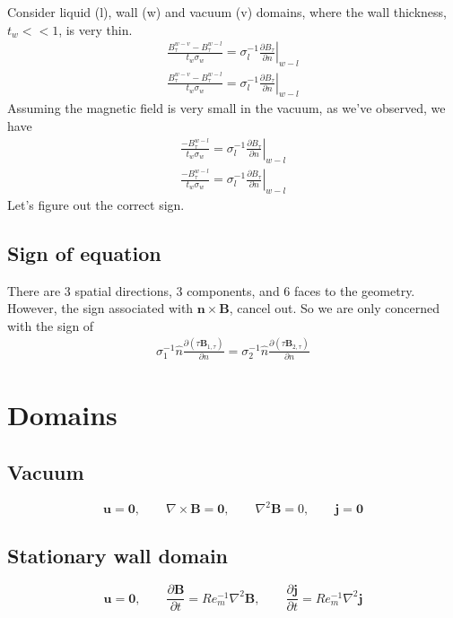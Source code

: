 \documentclass[11pt]{article}
\newcommand{\B}{\mathbf{B}}
\newcommand{\U}{\mathbf{u}}
\newcommand{\curl}{\nabla \times}
\newcommand{\PD}{\partial}
\newcommand{\J}{\mathbf{j}}
\newcommand{\N}{\mathbf{n}}
\begin{document}
Consider liquid (l), wall (w) and vacuum (v) domains, where the wall thickness, $t_w<<1$, is very thin.
\begin{equation} \begin{aligned}
  \frac{B_{\tau}^{w-v}-B_{\tau}^{w-l}}{t_w \sigma_w}=\left. \sigma_l^{-1}\frac{\PD B_{\tau}}{\PD n} \right|_{w-l} \\
  \frac{B_{\tau}^{w-v}-B_{\tau}^{w-l}}{t_w \sigma_w}=\left. \sigma_l^{-1}\frac{\PD B_{\tau}}{\PD n} \right|_{w-l}
\end{aligned} \end{equation}
Assuming the magnetic field is very small in the vacuum, as we've observed, we have
\begin{equation} \begin{aligned}
  \frac{-B_{\tau}^{w-l}}{t_w \sigma_w}=\left. \sigma_l^{-1}\frac{\PD B_{\tau}}{\PD n} \right|_{w-l} \\
  \frac{-B_{\tau}^{w-l}}{t_w \sigma_w}=\left. \sigma_l^{-1}\frac{\PD B_{\tau}}{\PD n} \right|_{w-l}
\end{aligned} \end{equation}
Let's figure out the correct sign.
\subsection{Sign of equation}
There are 3 spatial directions, 3 components, and 6 faces to the geometry. However, the sign associated with $\mathbf{\N \times \B}$, cancel out. So we are only concerned with the sign of 
\begin{equation}\begin{aligned}
\sigma_1^{-1} \hat{n} \frac{\PD (\tau \B_{1,\tau})}{\PD n} = 
\sigma_2^{-1} \hat{n} \frac{\PD (\tau \B_{2,\tau})}{\PD n}
\end{aligned}\end{equation}


\section{Domains}

\subsection{Vacuum}
\begin{equation}
  \U = \mathbf{0}
  , \qquad
  \curl \B = \mathbf{0}
  , \qquad
  \nabla^2 \B = 0
  , \qquad
  \J = \mathbf{0}
\end{equation}
\subsection{Stationary wall domain}
\begin{equation}
  \U = \mathbf{0}
  , \qquad
  \frac{\PD \B}{\PD t} = Re_m^{-1} \nabla^2 \B
  , \qquad
  \frac{\PD \J}{\PD t} = Re_m^{-1} \nabla^2 \J
\end{equation}
\end{document}
